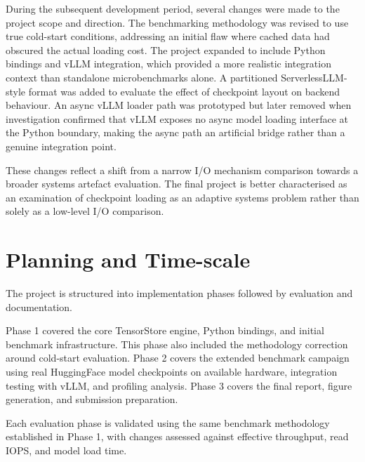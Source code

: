 During the subsequent development period, several changes were made to the project scope and direction. The benchmarking methodology was revised to use true cold-start conditions, addressing an initial flaw where cached data had obscured the actual loading cost. The project expanded to include Python bindings and vLLM integration, which provided a more realistic integration context than standalone microbenchmarks alone. A partitioned ServerlessLLM-style format was added to evaluate the effect of checkpoint layout on backend behaviour. An async vLLM loader path was prototyped but later removed when investigation confirmed that vLLM exposes no async model loading interface at the Python boundary, making the async path an artificial bridge rather than a genuine integration point.

These changes reflect a shift from a narrow I/O mechanism comparison towards a broader systems artefact evaluation. The final project is better characterised as an examination of checkpoint loading as an adaptive systems problem rather than solely as a low-level I/O comparison.

\section{Planning and Time-scale}

The project is structured into implementation phases followed by evaluation and documentation.

Phase 1 covered the core TensorStore engine, Python bindings, and initial benchmark infrastructure. This phase also included the methodology correction around cold-start evaluation. Phase 2 covers the extended benchmark campaign using real HuggingFace model checkpoints on available hardware, integration testing with vLLM, and profiling analysis. Phase 3 covers the final report, figure generation, and submission preparation.

Each evaluation phase is validated using the same benchmark methodology established in Phase 1, with changes assessed against effective throughput, read IOPS, and model load time.
